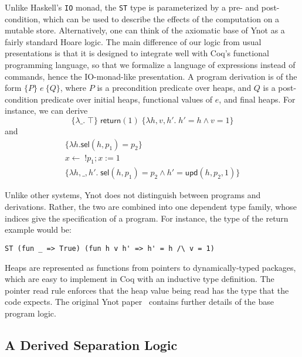 \documentclass[preprint,nocopyrightspace]{sigplanconf}
\newcommand{\cd}[1]{\texttt{#1}}
\newcommand{\coq}[1]{\mathsf{#1}}
\newcommand{\return}[1]{\coq{return}(#1)}
\newcommand{\bind}{\leftarrow}
\newcommand{\rd}[1]{!#1}
\newcommand{\wri}[2]{#1 := #2}
\begin{document}
Unlike Haskell's \cd{IO} monad, the \cd{ST} type is parameterized by a pre- and post-condition, which can be used to describe the effects of the computation on a mutable store.  Alternatively, one can think of the axiomatic base of Ynot as a fairly standard Hoare logic.  The main difference of our logic from usual presentations is that it is designed to integrate well with Coq's functional programming language, so that we formalize a language of expressions instead of commands, hence the IO-monad-like presentation.  A program derivation is of the form $\{P\} \; e \: \{Q\}$, where $P$ is a precondition predicate over heaps, and $Q$ is a post-condition predicate over initial heaps, functional values of $e$, and final heaps.  For instance, we can derive
$$\{\lambda \_. \; \top\} \; \return{1} \; \{\lambda h, v, h'. \; h' = h \land v = 1\}$$
and
$$\begin{array}{c}
  \{\lambda h. \coq{sel}(h, p_1) = p_2\} \\
  x \bind \; \rd{p_1}; \wri{x}{1} \\
  \{\lambda h, \_, h'. \; \coq{sel}(h, p_1) = p_2 \land h' = \coq{upd}(h, p_2, 1)\}
\end{array}$$

Unlike other systems, Ynot does not distinguish between programs and derivations. Rather, the two are combined into one dependent type family, whose indices give the specification of a program.  For instance, the type of the return example would be:
\begin{verbatim}
ST (fun _ => True) (fun h v h' => h' = h /\ v = 1)
\end{verbatim}

Heaps are represented as functions from pointers to dynamically-typed packages, which are easy to implement in Coq with an inductive type definition.  The pointer read rule enforces that the heap value being read has the type that the code expects.  The original Ynot paper~\cite{ynot:icfp} contains further details of the base program logic.


\subsection{A Derived Separation Logic}
\end{document}
